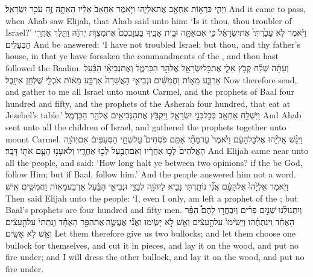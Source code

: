 {וַיְהִ֛י כִּרְא֥וֹת אַחְאָ֖ב אֶת\maqqaf אֵלִיָּ֑הוּ וַיֹּ֤אמֶר אַחְאָב֙ אֵלָ֔יו הַאַתָּ֥ה זֶ֖ה עֹכֵ֥ר יִשְׂרָאֵֽל׃}
{And it came to pass, when Ahab saw Elijah, that Ahab said unto him: ‘Is it thou, thou troubler of Israel?’}
{וַיֹּ֗אמֶר לֹ֤א עָכַ֙רְתִּי֙ אֶת\maqqaf יִשְׂרָאֵ֔ל כִּ֥י אִם\maqqaf אַתָּ֖ה וּבֵ֣ית אָבִ֑יךָ בַּעֲזׇבְכֶם֙ אֶת\maqqaf מִצְוֺ֣ת יְהֹוָ֔ה וַתֵּ֖לֶךְ אַחֲרֵ֥י הַבְּעָלִֽים׃}
{And be answered: ‘I have not troubled Israel; but thou, and thy father’s house, in that ye have forsaken the commandments of the \lord, and thou hast followed the Baalim.}
{וְעַתָּ֗ה שְׁלַ֨ח קְבֹ֥ץ אֵלַ֛י אֶת\maqqaf כׇּל\maqqaf יִשְׂרָאֵ֖ל אֶל\maqqaf הַ֣ר הַכַּרְמֶ֑ל וְאֶת\maqqaf נְבִיאֵ֨י הַבַּ֜עַל אַרְבַּ֧ע מֵא֣וֹת וַחֲמִשִּׁ֗ים וּנְבִיאֵ֤י הָאֲשֵׁרָה֙ אַרְבַּ֣ע מֵא֔וֹת אֹכְלֵ֖י שֻׁלְחַ֥ן אִיזָֽבֶל׃}
{Now therefore send, and gather to me all Israel unto mount Carmel, and the prophets of Baal four hundred and fifty, and the prophets of the Asherah four hundred, that eat at Jezebel’s table.’}
{וַיִּשְׁלַ֥ח אַחְאָ֖ב בְּכׇל\maqqaf בְּנֵ֣י יִשְׂרָאֵ֑ל וַיִּקְבֹּ֥ץ אֶת\maqqaf הַנְּבִיאִ֖ים אֶל\maqqaf הַ֥ר הַכַּרְמֶֽל׃}
{And Ahab sent unto all the children of Israel, and gathered the prophets together unto mount Carmel.}
{וַיִּגַּ֨שׁ אֵלִיָּ֜הוּ אֶל\maqqaf כׇּל\maqqaf הָעָ֗ם וַיֹּ֙אמֶר֙ עַד\maqqaf מָתַ֞י אַתֶּ֣ם פֹּסְחִים֮ עַל\maqqaf שְׁתֵּ֣י הַסְּעִפִּים֒ אִם\maqqaf יְהֹוָ֤ה הָאֱלֹהִים֙ לְכ֣וּ אַחֲרָ֔יו וְאִם\maqqaf הַבַּ֖עַל לְכ֣וּ אַחֲרָ֑יו וְלֹא\maqqaf עָנ֥וּ הָעָ֛ם אֹת֖וֹ דָּבָֽר׃}
{And Elijah came near unto all the people, and said: ‘How long halt ye between two opinions? if the \lord\space be God, follow Him; but if Baal, follow him.’ And the people answered him not a word.}
{וַיֹּ֤אמֶר אֵלִיָּ֙הוּ֙ אֶל\maqqaf הָעָ֔ם אֲנִ֞י נוֹתַ֧רְתִּי נָבִ֛יא לַיהֹוָ֖ה לְבַדִּ֑י וּנְבִיאֵ֣י הַבַּ֔עַל אַרְבַּע\maqqaf מֵא֥וֹת וַחֲמִשִּׁ֖ים אִֽישׁ׃}
{Then said Elijah unto the people: ‘I, even I only, am left a prophet of the \lord; but Baal’s prophets are four hundred and fifty men.}
{וְיִתְּנוּ\maqqaf לָ֜נוּ שְׁנַ֣יִם פָּרִ֗ים וְיִבְחֲר֣וּ לָהֶם֩ הַפָּ֨ר הָאֶחָ֜ד וִינַתְּחֻ֗הוּ וְיָשִׂ֙ימוּ֙ עַל\maqqaf הָ֣עֵצִ֔ים וְאֵ֖שׁ לֹ֣א יָשִׂ֑ימוּ וַאֲנִ֞י אֶעֱשֶׂ֣ה \legarmeh  אֶת\maqqaf הַפָּ֣ר הָאֶחָ֗ד וְנָֽתַתִּי֙ עַל\maqqaf הָ֣עֵצִ֔ים וְאֵ֖שׁ לֹ֥א אָשִֽׂים׃}
{Let them therefore give us two bullocks; and let them choose one bullock for themselves, and cut it in pieces, and lay it on the wood, and put no fire under; and I will dress the other bullock, and lay it on the wood, and put no fire under.}

